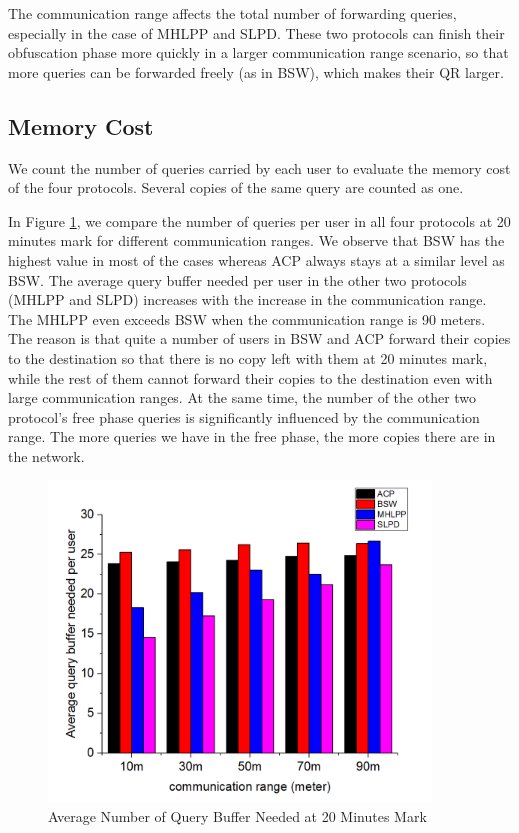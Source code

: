 The communication range affects the total number of forwarding queries, especially in the case of MHLPP and SLPD. These two protocols can finish their obfuscation phase more quickly in a larger communication range scenario, so that more queries can be forwarded freely (as in BSW), which makes their QR larger.

\subsection{ Memory Cost}

\noindent We count the number of queries carried by each user to evaluate the memory cost of the four protocols. Several copies of the same query are counted as one.

In Figure \ref{fig:F419AverageQueryBufferNeededAt20Minutes}, we compare the number of queries per user in all four protocols at 20 minutes mark for different communication ranges. We observe that BSW has the highest value in most of the cases whereas ACP always stays at a similar level as BSW. The average query buffer needed per user in the other two protocols (MHLPP and SLPD) increases with the increase in the communication range. The MHLPP even exceeds BSW when the communication range is 90 meters. The reason is that quite a number of users in BSW and ACP forward their copies to the destination so that there is no copy left with them at 20 minutes mark, while the rest of them cannot forward their copies to the destination even with large communication ranges. At the same time, the number of the other two protocol's free phase queries is significantly influenced by the communication range. The more queries we have in the free phase, the more copies there are in the network.

\begin{figure} [hbtp]
\centering 
\includegraphics[width=4.0in]{olgraph/QbnpuCr.png}
\caption{Average Number of Query Buffer Needed at 20 Minutes Mark} 
\label{fig:F419AverageQueryBufferNeededAt20Minutes} %
\end{figure}

